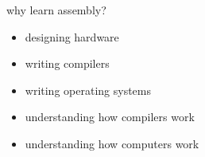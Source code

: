 \begin{frame}{why learn assembly?}
    \begin{itemize}
    \item designing hardware
    \item writing compilers
    \item writing operating systems
    \item understanding how compilers work
    \item understanding how computers work
    \end{itemize}
\end{frame}
